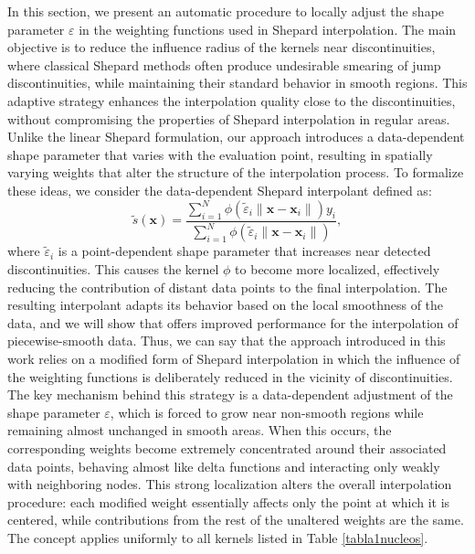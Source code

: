 \documentclass[preprint]{elsarticle}       %
\begin{document}
In this section, we present an automatic procedure to locally adjust the shape parameter $\varepsilon$ in the weighting functions used in Shepard interpolation. The main objective is to reduce the influence radius of the kernels near discontinuities, where classical Shepard methods often produce undesirable smearing of jump discontinuities, while maintaining their standard behavior in smooth regions. This adaptive strategy enhances the interpolation quality close to the discontinuities, without compromising the properties of Shepard interpolation in regular areas.
Unlike the linear Shepard formulation, our approach introduces a data-dependent shape parameter that varies with the evaluation point, resulting in spatially varying weights that alter the structure of the interpolation process. To formalize these ideas, we consider the data-dependent Shepard interpolant defined as:
\begin{equation}\label{int_shepard}
\tilde{s}(\mathbf{x}) = \frac{\displaystyle\sum_{i=1}^N \phi(\tilde{\varepsilon}_i \|\mathbf{x} - \mathbf{x}_i\|) y_i}{\displaystyle\sum_{i=1}^N \phi(\tilde{\varepsilon}_i \|\mathbf{x} - \mathbf{x}_i\|)},
\end{equation}
where $\tilde{\varepsilon}_i$ is a point-dependent shape parameter that increases near detected discontinuities. This causes the kernel $\phi$ to become more localized, effectively reducing the contribution of distant data points to the final interpolation. The resulting interpolant adapts its behavior based on the local smoothness of the data, and we will show that offers improved performance for the interpolation of piecewise-smooth data. Thus, we can say that the approach introduced in this work relies on a modified form of Shepard interpolation in which the influence of the weighting functions is deliberately reduced in the vicinity of discontinuities. The key mechanism behind this strategy is a data-dependent adjustment of the shape parameter $\varepsilon$, which is forced to grow near non-smooth regions while remaining almost unchanged in smooth areas. When this occurs, the corresponding weights become extremely concentrated around their associated data points, behaving almost like delta functions and interacting only weakly with neighboring nodes. This strong localization alters the overall interpolation procedure: each modified weight essentially affects only the point at which it is centered, while contributions from the rest of the unaltered weights are the same. The concept applies uniformly to all kernels listed in Table \ref{tabla1nucleos}.
\end{document}
